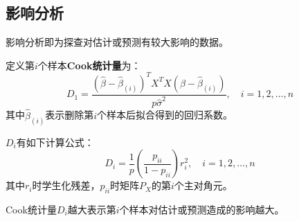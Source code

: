 \subsection{影响分析}
影响分析即为探查对估计或预测有较大影响的数据。
\begin{definition}
	定义第$i$个样本\textbf{Cook统计量}为：
	\begin{equation*}
		D_1=\frac{(\hat{\beta}-\hat{\beta}_{(i)})^TX^TX(\hat{\beta}-\hat{\beta}_{(i)})}{p\hat{\sigma}^2},\quad i=1,2,\dots,n
	\end{equation*}
	其中$\hat{\beta}_{(i)}$表示删除第$i$个样本后拟合得到的回归系数。
\end{definition}
\begin{theorem}
	$D_i$有如下计算公式：
	\begin{equation*}
		D_i=\frac{1}{p}\left(\frac{p_{ii}}{1-p_{ii}}\right)r_i^2,\quad i=1,2,\dots,n
	\end{equation*}
	其中$r_i$时学生化残差，$p_{ii}$时矩阵$P_X$的第$i$个主对角元。
\end{theorem}
\begin{note}
	Cook统计量$D_i$越大表示第$i$个样本对估计或预测造成的影响越大。
\end{note}
